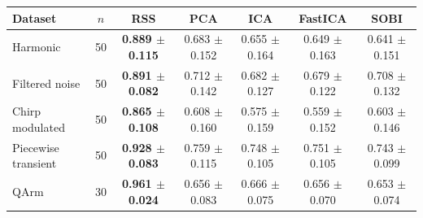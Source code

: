 \begin{tabular}{lcccccc}
\hline
Dataset & $n$ & RSS & PCA & ICA & FastICA & SOBI \\
\hline
Harmonic & 50 & \textbf{0.889 $\pm$ 0.115} & 0.683 $\pm$ 0.152 & 0.655 $\pm$ 0.164 & 0.649 $\pm$ 0.163 & 0.641 $\pm$ 0.151 \\
Filtered noise & 50 & \textbf{0.891 $\pm$ 0.082} & 0.712 $\pm$ 0.142 & 0.682 $\pm$ 0.127 & 0.679 $\pm$ 0.122 & 0.708 $\pm$ 0.132 \\
Chirp modulated & 50 & \textbf{0.865 $\pm$ 0.108} & 0.608 $\pm$ 0.160 & 0.575 $\pm$ 0.159 & 0.559 $\pm$ 0.152 & 0.603 $\pm$ 0.146 \\
Piecewise transient & 50 & \textbf{0.928 $\pm$ 0.083} & 0.759 $\pm$ 0.115 & 0.748 $\pm$ 0.105 & 0.751 $\pm$ 0.105 & 0.743 $\pm$ 0.099 \\
QArm & 30 & \textbf{0.961 $\pm$ 0.024} & 0.656 $\pm$ 0.083 & 0.666 $\pm$ 0.075 & 0.656 $\pm$ 0.070 & 0.653 $\pm$ 0.074 \\
\hline
\end{tabular}